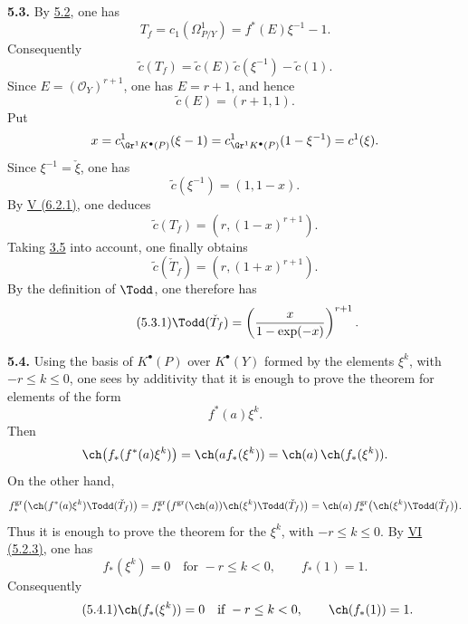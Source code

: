 \textbf{5.3.} By \hyperlink{sga6.e08.prop.5-2}{5.2}, one has
\[
 T_f=c_1(\Omega^1_{P/Y})=f^*(E)\xi^{-1}-1.
\]
Consequently
\[
 \widetilde c(T_f)=\widetilde c(E)\,\widetilde c(\xi^{-1})-\widetilde c(1).
\]
Since \(E=(\mathcal O_Y)^{r+1}\), one has \(E=r+1\), and hence
\[
 \widetilde c(E)=(r+1,1).
\]
Put
\[
 x=c^1_{\Gr^1K^{\bullet}(P)}(\xi-1)
 =
 c^1_{\Gr^1K^{\bullet}(P)}(1-\xi^{-1})
 =
 c^1(\xi).
\]
Since \(\xi^{-1}=\check \xi\), one has
\[
 \widetilde c(\xi^{-1})=(1,1-x).
\]
By \hyperlink{sga6.e05.eq.6-2-1}{V (6.2.1)}, one deduces
\[
 \widetilde c(T_f)=(r,(1-x)^{r+1}).
\]
Taking \hyperlink{sga6.e08.prop.3-5}{3.5} into account, one finally obtains
\[
 \widetilde c(\check T_f)=(r,(1+x)^{r+1}).
\]
By the definition of \(\Todd\), one therefore has
\begin{equation}\tag{5.3.1}
 \Todd(\check T_f)=
 \left(\frac{x}{1-\exp(-x)}\right)^{r+1}.
\end{equation}

\textbf{5.4.} Using the basis of \(K^{\bullet}(P)\) over \(K^{\bullet}(Y)\) formed by the elements \(\xi^k\), with \(-r\leq k\leq0\), one sees by additivity that it is enough to prove the theorem for elements of the form
\[
 f^*(a)\xi^k .
\]
Then
\[
 \ch\bigl(f_*(f^*(a)\xi^k)\bigr)
 =
 \ch(a f_*(\xi^k))
 =
 \ch(a)\,\ch(f_*(\xi^k)).
\]
On the other hand,
\[
 f^{\mathrm{gr}}_*\bigl(\ch(f^*(a)\xi^k)\Todd(\check T_f)\bigr)
 =
 f^{\mathrm{gr}}_*\bigl(f^{\mathrm{gr}}(\ch(a))\ch(\xi^k)\Todd(\check T_f)\bigr)
 =
 \ch(a)\,f^{\mathrm{gr}}_*\bigl(\ch(\xi^k)\Todd(\check T_f)\bigr).
\]
Thus it is enough to prove the theorem for the \(\xi^k\), with \(-r\leq k\leq0\). By \hyperlink{sga6.e06.sec.5.2}{VI (5.2.3)}, one has
\[
 f_*(\xi^k)=0\quad\text{for }-r\leq k<0,\qquad f_*(1)=1.
\]
Consequently
\begin{equation}\tag{5.4.1}
 \ch(f_*(\xi^k))=0\quad\text{if }-r\leq k<0,\qquad
 \ch(f_*(1))=1.
\end{equation}


